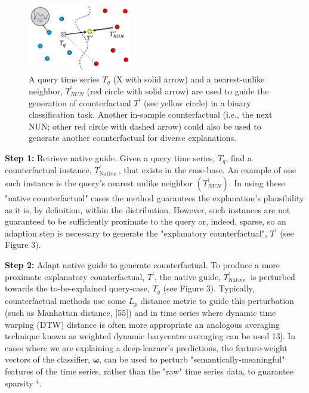 \begin{figure}[h]
    \centering
    \includegraphics[width=0.4\textwidth]{CF/images/instance-based.jpg}
    \caption{A query time series $T_{q}$ (X with solid arrow) and a nearest-unlike neighbor, $T_{N U N}^{\prime}$ (red circle with solid arrow) are used to guide the generation of counterfactual $T^{\prime}$ (see yellow circle) in a binary classification task. Another in-sample counterfactual (i.e., the next NUN; other red circle with dashed arrow) could also be used to generate another counterfactual for diverse explanations.}
\end{figure}


\textbf{Step 1:} Retrieve native guide. Given a query time series, $T_{q}$, find a counterfactual instance, $T_{\text {Native }}^{\prime}$, that exists in the case-base. An example of one such instance is the query's nearest unlike neighbor $\left(T_{N U N}^{\prime}\right)$. In using these "native counterfactual" cases the method guarantees the explanation's plausibility as it is, by definition, within the distribution. However, such instances are not guaranteed to be sufficiently proximate to the query or, indeed, sparse, so an adaption step is necessary to generate the "explanatory counterfactual", $T^{\prime}$ (see Figure $3)$.

\textbf{Step 2:} Adapt native guide to generate counterfactual. To produce a more proximate explanatory counterfactual, $T^{\prime}$, the native guide, $T_{\text {Native }}^{\prime}$ is perturbed towards the to-be-explained query-case, $T_{q}$ (see Figure 3). Typically, counterfactual methods use some $L_{p}$ distance metric to guide this perturbation (such as Manhattan distance, [55]) and in time series where dynamic time warping (DTW) distance is often more appropriate an analogous averaging technique known as weighted dynamic barycentre averaging can be used 13]. In cases where we are explaining a deep-learner's predictions, the feature-weight vectors of the classifier, $\boldsymbol{\omega}$, can be used to perturb "semantically-meaningful" features of the time series, rather than the "raw" time series data, to guarantee sparsity ${ }^{4}$.

